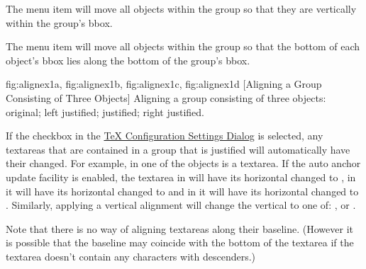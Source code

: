 
The  menu item will move all objects
within the \gls{group} so that they are  vertically
within the group's \gls{bbox}.


The  menu item will move all objects
within the \gls{group} so that the bottom of each object's \gls*{bbox} lies
along the bottom of the group's \gls*{bbox}.

{
  {fig:alignex1a}{}{},
  {fig:alignex1b}{}{},
  {fig:alignex1c}{}{},
  {fig:alignex1d}{}{}
}
[Aligning a Group Consisting of Three Objects]
{Aligning a group consisting of three objects: 
 original; 
 left justified; 
  justified; 
 right justified.}

If the  \gls{checkbox} in the
\hyperref[sec:texconfig]{TeX Configuration Settings Dialog} is
selected, any \glspl{textarea} that are contained in a group that is
justified will automatically have their  changed.
For example, in  one of the objects is a
\gls*{textarea}.  If the auto anchor update facility is enabled, the
\gls*{textarea} in  will have its
horizontal  changed to ,
in  it will have its horizontal
 changed to  and in
 it will have its horizontal
 changed to . Similarly,
applying a vertical alignment will change the vertical
 to one of: ,
 or .

\begin{information}
Note that there is no way of aligning \glspl{textarea} along their
baseline. (However it is possible that the baseline may coincide
with the bottom of the \gls*{textarea} if the \gls*{textarea} doesn't contain
any characters with descenders.)
\end{information}


